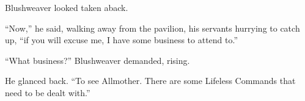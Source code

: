 Blushweaver looked taken aback.

“Now,” he said, walking away from the pavilion, his servants hurrying to catch up, “if you will excuse me, I have some business to attend to.”

“What business?” Blushweaver demanded, rising.

He glanced back. “To see Allmother. There are some Lifeless Commands that need to be dealt with.”

